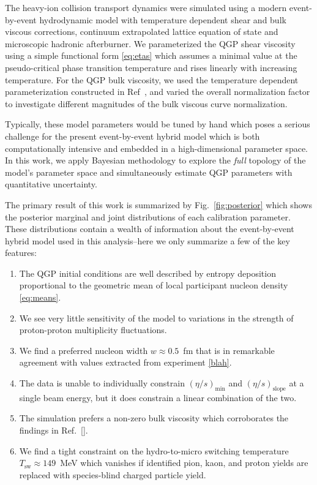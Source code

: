 \documentclass[aps,prc,reprint,amsmath,nofootinbib,superscriptaddress]{revtex4-1}
\begin{document}
The heavy-ion collision transport dynamics were simulated using a modern event-by-event hydrodynamic model with temperature dependent shear and bulk viscous corrections, continuum extrapolated lattice equation of state and microscopic hadronic afterburner.
We parameterized the QGP shear viscosity using a simple functional form \eqref{eq:etas} which assumes a minimal value at the pseudo-critical phase transition temperature and rises linearly with increasing temperature.
For the QGP bulk viscosity, we used the temperature dependent parameterization constructed in Ref~\cite{Denicol:2009am, Ryu:2015vwa}, and varied the overall normalization factor to investigate different magnitudes of the bulk viscous curve normalization.

Typically, these model parameters would be tuned by hand which poses a serious challenge for the present event-by-event hybrid model which is both computationally intensive and embedded in a high-dimensional parameter space.
In this work, we apply Bayesian methodology to explore the \emph{full} topology of the model's parameter space and simultaneously estimate QGP parameters with quantitative uncertainty.

The primary result of this work is summarized by Fig.~\ref{fig:posterior} which shows the posterior marginal and joint distributions of each calibration parameter.
These distributions contain a wealth of information about the event-by-event hybrid model used in this analysis--here we only summarize a few of the key features:
\begin{enumerate}
    \item The QGP initial conditions are well described by entropy deposition proportional to the geometric mean of local participant nucleon density \eqref{eq:means}.
    \item We see very little sensitivity of the model to variations in the strength of proton-proton multiplicity fluctuations.
    \item We find a preferred nucleon width $w\approx0.5$~fm that is in remarkable agreement with values extracted from experiment \ref{blah}.
    \item The data is unable to individually constrain $(\eta/s)_\text{min}$ and $(\eta/s)_\text{slope}$ at a single beam energy, but it does constrain a linear combination of the two.
    \item The simulation prefers a non-zero bulk viscosity which corroborates the findings in Ref.~\ref{}.
    \item We find a tight constraint on the hydro-to-micro switching temperature ${T_\text{sw} \approx 149}$~MeV which vanishes if identified pion, kaon, and proton yields are replaced with species-blind charged particle yield.
\end{enumerate}
\end{document}
